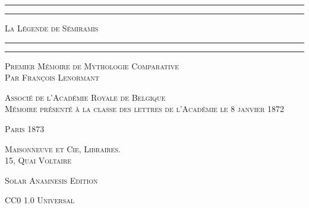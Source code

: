\documentclass[a4paper, 11pt, oneside]{article}
\begin{document}
\begin{titlepage} %
	\centering %

	
	\rule{\textwidth}{1.6pt}\vspace*{-\baselineskip}\vspace*{2pt} %
	\rule{\textwidth}{0.4pt} %
	
	\vspace{1\baselineskip} %
	
	{\scshape\Huge La Légende de Sémiramis}
	
	\vspace{1\baselineskip} %

	\rule{\textwidth}{0.4pt}\vspace*{-\baselineskip}\vspace{3.2pt} %
	\rule{\textwidth}{1.6pt} %
	
	\vspace{1\baselineskip} %
	
	
	{\scshape \small Premier Mémoire de Mythologie Comparative 	\vspace{0.5\baselineskip}\\\Large Par François Lenormant} %
	
	\vspace*{1\baselineskip} %
	
        {\scshape\small Associé de l'Académie Royale de Belgique\\\normalsize Mémoire présenté à la classe des lettres de l'Académie le 8 janvier 1872} %
    
        \vspace*{\fill}

	\vspace{1\baselineskip}

	{\small\scshape Paris 1873}
	
	{\small\scshape{Maisonneuve et Cie, Libraires. \\ 15, Quai Voltaire}}
	
	\vspace{0.5\baselineskip} %

        \scshape Solar Anamnesis Edition  %
	
	{\scshape\small CC0 1.0 Universal} %
\end{titlepage}
\setlength{\parskip}{1mm plus1mm minus1mm}
\clearpage
\tableofcontents
\clearpage
\end{document}
